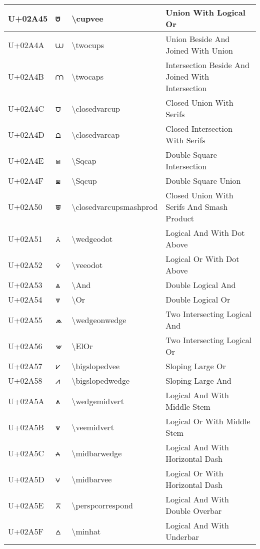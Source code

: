 \begin{table}[h]
\begin{tabulary}{\linewidth}{|L|L|L|L|}
\hline
U+02A45 & ⩅ & {\textbackslash}cupvee & Union With Logical Or \\
\hline
U+02A4A & ⩊ & {\textbackslash}twocups & Union Beside And Joined With Union \\
\hline
U+02A4B & ⩋ & {\textbackslash}twocaps & Intersection Beside And Joined With Intersection \\
\hline
U+02A4C & ⩌ & {\textbackslash}closedvarcup & Closed Union With Serifs \\
\hline
U+02A4D & ⩍ & {\textbackslash}closedvarcap & Closed Intersection With Serifs \\
\hline
U+02A4E & ⩎ & {\textbackslash}Sqcap & Double Square Intersection \\
\hline
U+02A4F & ⩏ & {\textbackslash}Sqcup & Double Square Union \\
\hline
U+02A50 & ⩐ & {\textbackslash}closedvarcupsmashprod & Closed Union With Serifs And Smash Product \\
\hline
U+02A51 & ⩑ & {\textbackslash}wedgeodot & Logical And With Dot Above \\
\hline
U+02A52 & ⩒ & {\textbackslash}veeodot & Logical Or With Dot Above \\
\hline
U+02A53 & ⩓ & {\textbackslash}And & Double Logical And \\
\hline
U+02A54 & ⩔ & {\textbackslash}Or & Double Logical Or \\
\hline
U+02A55 & ⩕ & {\textbackslash}wedgeonwedge & Two Intersecting Logical And \\
\hline
U+02A56 & ⩖ & {\textbackslash}ElOr & Two Intersecting Logical Or \\
\hline
U+02A57 & ⩗ & {\textbackslash}bigslopedvee & Sloping Large Or \\
\hline
U+02A58 & ⩘ & {\textbackslash}bigslopedwedge & Sloping Large And \\
\hline
U+02A5A & ⩚ & {\textbackslash}wedgemidvert & Logical And With Middle Stem \\
\hline
U+02A5B & ⩛ & {\textbackslash}veemidvert & Logical Or With Middle Stem \\
\hline
U+02A5C & ⩜ & {\textbackslash}midbarwedge & Logical And With Horizontal Dash \\
\hline
U+02A5D & ⩝ & {\textbackslash}midbarvee & Logical Or With Horizontal Dash \\
\hline
U+02A5E & ⩞ & {\textbackslash}perspcorrespond & Logical And With Double Overbar \\
\hline
U+02A5F & ⩟ & {\textbackslash}minhat & Logical And With Underbar \\

\end{tabulary}
\end{table}
